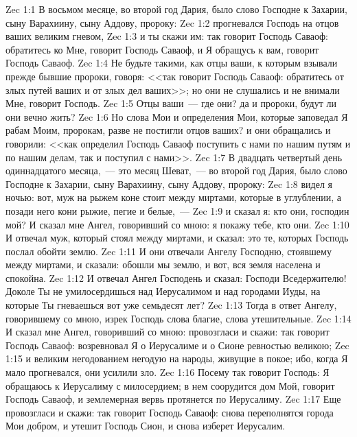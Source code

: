 \vs Zec 1:1 В восьмом месяце, во второй год Дария, было слово Господне к Захарии, сыну Варахиину, сыну Аддову, пророку:
\vs Zec 1:2 прогневался Господь на отцов ваших великим гневом,
\vs Zec 1:3 и ты скажи им: так говорит Господь Саваоф: обратитесь ко Мне, говорит Господь Саваоф, и Я обращусь к вам, говорит Господь Саваоф.
\vs Zec 1:4 Не будьте такими, как отцы ваши, к которым взывали прежде бывшие пророки, говоря: <<так говорит Господь Саваоф: обратитесь от злых путей ваших и от злых дел ваших>>; но они не слушались и не внимали Мне, говорит Господь.
\vs Zec 1:5 Отцы ваши~--- где они? да и пророки, будут ли они вечно жить?
\vs Zec 1:6 Но слова Мои и определения Мои, которые заповедал Я рабам Моим, пророкам, разве не постигли отцов ваших? и они обращались и говорили: <<как определил Господь Саваоф поступить с нами по нашим путям и по нашим делам, так и поступил с нами>>.
\rsbpar\vs Zec 1:7 В двадцать четвертый день одиннадцатого месяца,~--- это месяц Шеват,~--- во второй год Дария, было слово Господне к Захарии, сыну Варахиину, сыну Аддову, пророку:
\vs Zec 1:8 видел я ночью: вот, муж на рыжем коне стоит между миртами, которые в углублении, а позади него кони рыжие, пегие и белые,~---
\vs Zec 1:9 и сказал я: кто они, господин мой? И сказал мне Ангел, говоривший со мною: я покажу тебе, кто они.
\vs Zec 1:10 И отвечал муж, который стоял между миртами, и сказал: это те, которых Господь послал обойти землю.
\vs Zec 1:11 И они отвечали Ангелу Господню, стоявшему между миртами, и сказали: обошли мы землю, и вот, вся земля населена и спокойна.
\vs Zec 1:12 И отвечал Ангел Господень и сказал: Господи Вседержителю! Доколе Ты не умилосердишься над Иерусалимом и над городами Иуды, на которые Ты гневаешься вот уже семьдесят лет?
\vs Zec 1:13 Тогда в ответ Ангелу, говорившему со мною, изрек Господь слова благие, слова утешительные.
\vs Zec 1:14 И сказал мне Ангел, говоривший со мною: провозгласи и скажи: так говорит Господь Саваоф: возревновал Я о Иерусалиме и о Сионе ревностью великою;
\vs Zec 1:15 и великим негодованием негодую на народы, живущие в покое; ибо, когда Я мало прогневался, они усилили зло.
\vs Zec 1:16 Посему так говорит Господь: Я обращаюсь к Иерусалиму с милосердием; в нем соорудится дом Мой, говорит Господь Саваоф, и землемерная вервь протянется по Иерусалиму.
\vs Zec 1:17 Еще провозгласи и скажи: так говорит Господь Саваоф: снова переполнятся города Мои добром, и утешит Господь Сион, и снова изберет Иерусалим.
